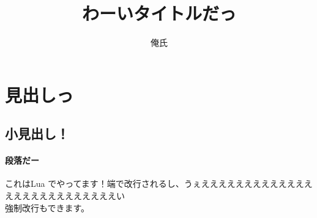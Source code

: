 \documentclass{ltjsarticle}
\begin{document}
\title{わーいタイトルだっ\mathrm{\LaTeX} }
\author{俺氏}
\maketitle
\section{見出しっ}
\subsection{小見出し！}
\paragraph{段落だー}
これはLua\mathrm{\LaTeX} でやってます！端で改行されるし、うぇええええええええええええええええええええええええええい\\
強制改行もできます。
\end{document}
